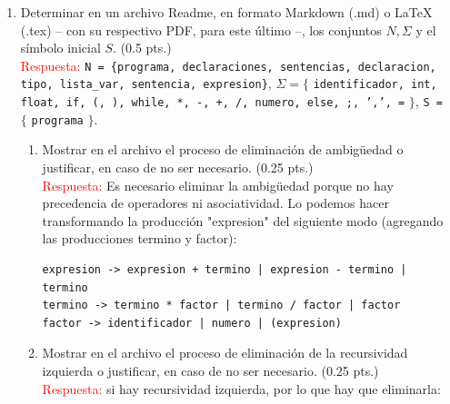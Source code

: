 \documentclass[11pt]{report}
\begin{document}
\begin{enumerate}
  \item Determinar en un archivo Readme, en formato Markdown (.md) o LaTeX (.tex) -- con su
  respectivo PDF, para este último --, los conjuntos $N, \Sigma$ y el símbolo inicial $S$.
    (0.5 pts.) \\
    \textcolor{red}{Respuesta:} \texttt{N = \{programa, declaraciones, sentencias, declaracion,
    tipo, lista\_var, sentencia, expresion\}}, $\Sigma = \{$ \texttt{identificador, int, float,
    if, (, ), while, *, -, +, /, numero, else, ;, ',', =} $\}$, \texttt{S = } $\{$
    \texttt{programa} $\}$.
    \begin{enumerate}[label=\alph*.]
      \item Mostrar en el archivo el proceso de eliminación de ambigüedad o justificar, en caso
  de no ser necesario. (0.25 pts.) \\
        \textcolor{red}{Respuesta:} Es necesario eliminar la ambigüedad porque no hay precedencia
    de operadores ni asociatividad. Lo podemos hacer transformando la producción "expresion"
    del siguiente modo (agregando las producciones termino y factor):
    \begin{verbatim}
expresion -> expresion + termino | expresion - termino | termino
termino -> termino * factor | termino / factor | factor
factor -> identificador | numero | (expresion)
    \end{verbatim}
      \item Mostrar en el archivo el proceso de eliminación de la recursividad izquierda o
  justificar, en caso de no ser necesario. (0.25 pts.) \\
        \textcolor{red}{Respuesta:} si hay recursividad izquierda, por lo que hay que eliminarla: \\


\end{enumerate}
\end{enumerate}
\end{document}
